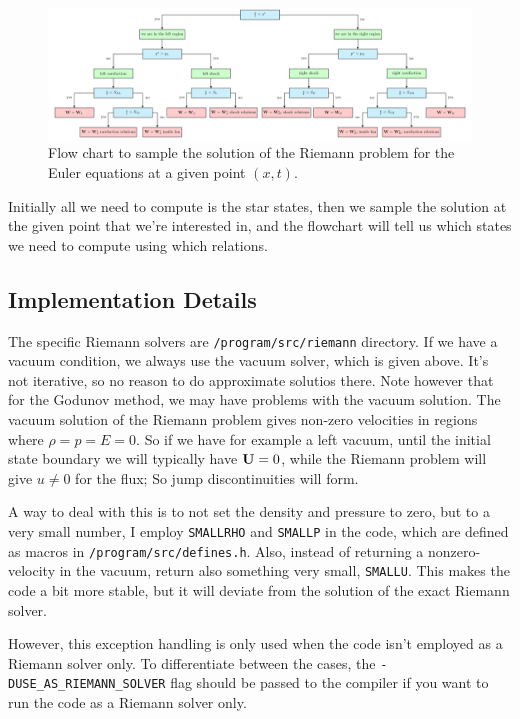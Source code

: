\begin{figure}
	\includegraphics[]{./figures/tikz/sampling_the_solution.pdf}%
	\caption{Flow chart to sample the solution of the Riemann problem for the Euler equations at a given point $(x, t)$.
		\label{fig:sampling-solution}
	}
\end{figure}

Initially all we need to compute is the star states, then we sample the solution at the given point that we're interested in, and the flowchart will tell us which states we need to compute using which relations.










\subsection{Implementation Details}


The specific Riemann solvers are \texttt{/program/src/riemann} directory.
If we have a vacuum condition, we always use the vacuum solver, which is given above.
It's not iterative, so no reason to do approximate solutios there.
Note however that for the Godunov method, we may have problems with the vacuum solution.
The vacuum solution of the Riemann problem gives non-zero velocities in regions where $\rho = p = E = 0$.
So if we have for example a left vacuum, until the initial state boundary we will typically have $\mathbf{U} = 0$, while the Riemann problem will give $u \neq 0$ for the flux;
So jump discontinuities will form.

A way to deal with this is to not set the density and pressure to zero, but to a very small number, I employ \texttt{SMALLRHO} and \texttt{SMALLP} in the code, which are defined as macros in \verb|/program/src/defines.h|.
Also, instead of returning a nonzero-velocity in the vacuum, return also something very small, \texttt{SMALLU}.
This makes the code a bit more stable, but it will deviate from the solution of the exact Riemann solver.


However, this exception handling is only used when the code isn't employed as a Riemann solver only.
To differentiate between the cases, the \verb|-DUSE_AS_RIEMANN_SOLVER| flag should be passed to the compiler if you want to run the code as a Riemann solver only.



